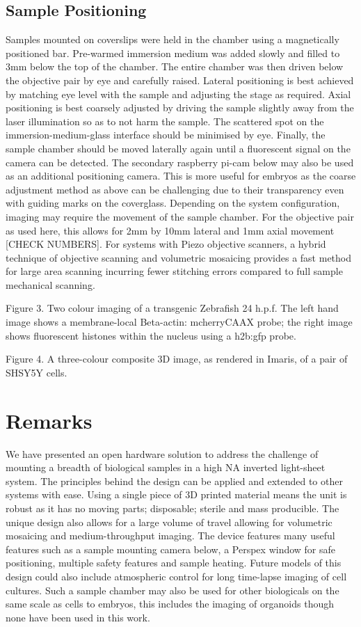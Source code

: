 \subsection{Sample Positioning}
Samples mounted on coverslips were held in the chamber using a magnetically positioned bar.
Pre-warmed immersion medium was added slowly and filled to 3mm below the top of the chamber.
The entire chamber was then driven below the objective pair by eye and carefully raised.
Lateral positioning is best achieved by matching eye level with the sample and adjusting the stage as required.
Axial positioning is best coarsely adjusted by driving the sample slightly away from the laser illumination so as to not harm the sample.
The scattered spot on the immersion-medium-glass interface should be minimised by eye.
Finally, the sample chamber should be moved laterally again until a fluorescent signal on the camera can be detected.
The secondary raspberry pi-cam below may also be used as an additional positioning camera.
This is more useful for embryos as the coarse adjustment method as above can be challenging due to their transparency even with guiding marks on the coverglass.
Depending on the system configuration, imaging may require the movement of the sample chamber.
For the objective pair as used here, this allows for 2mm by 10mm lateral and 1mm axial movement [CHECK NUMBERS].
For systems with Piezo objective scanners, a hybrid technique of objective scanning and volumetric mosaicing provides a fast method for large area scanning incurring fewer stitching errors compared to full sample mechanical scanning.

Figure 3.
Two colour imaging of a transgenic Zebrafish 24 h.p.f.
The left hand image shows a membrane-local  Beta-actin: mcherryCAAX probe; the right image shows fluorescent histones within the nucleus using a h2b:gfp probe.

Figure 4.
A three-colour composite 3D image, as rendered in Imaris, of a pair of SHSY5Y cells.
\section{Remarks}
We have presented an open hardware solution to address the challenge of mounting a breadth of biological samples in a high NA inverted light-sheet system.
The principles behind the design can be applied and extended to other systems with ease.
Using a single piece of 3D printed material means the unit is robust as it has no moving parts; disposable; sterile and mass producible.
The unique design also allows for a large volume of travel allowing for volumetric mosaicing and medium-throughput imaging.
The device features many useful features such as a sample mounting camera below, a Perspex window for safe positioning, multiple safety features and sample heating.
Future models of this design could also include atmospheric control for long time-lapse imaging of cell cultures. Such a sample chamber may also be used for other biologicals on the same scale as cells to embryos, this includes the imaging of organoids though none have been used in this work.



